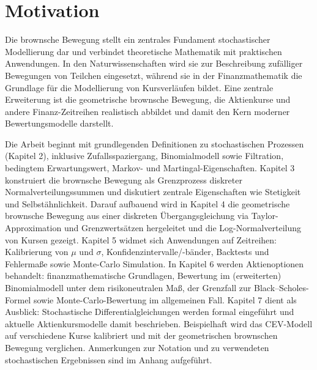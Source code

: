 \section{Motivation}

Die brownsche Bewegung stellt ein zentrales Fundament stochastischer Modellierung dar und verbindet theoretische Mathematik mit praktischen Anwendungen.
In den Naturwissenschaften wird sie zur Beschreibung zufälliger Bewegungen von Teilchen eingesetzt, während sie in der Finanzmathematik die Grundlage für die Modellierung von Kursverläufen bildet.
Eine zentrale Erweiterung ist die geometrische brownsche Bewegung, die Aktienkurse und andere Finanz-Zeitreihen realistisch abbildet und damit den Kern moderner Bewertungsmodelle darstellt.


Die Arbeit beginnt mit grundlegenden Definitionen zu stochastischen Prozessen (Kapitel 2), inklusive Zufallsspaziergang, Binomialmodell sowie Filtration, 
bedingtem Erwartungswert, Markov- und Martingal-Eigenschaften. Kapitel 3 konstruiert die brownsche Bewegung 
als Grenzprozess diskreter Normalverteilungssummen und diskutiert zentrale Eigenschaften wie Stetigkeit und 
Selbstähnlichkeit. Darauf aufbauend wird in Kapitel 4 die geometrische brownsche Bewegung aus einer diskreten Übergangsgleichung via Taylor-Approximation und Grenzwertsätzen hergeleitet und die Log-Normalverteilung von Kursen gezeigt. 
Kapitel 5 widmet sich Anwendungen auf Zeitreihen: Kalibrierung von $\mu$ und $\sigma$, 
Konfidenzintervalle/-bänder, Backtests und Fehlermaße sowie Monte-Carlo Simulation. In 
Kapitel 6 werden Aktienoptionen behandelt: finanzmathematische Grundlagen, Bewertung im 
(erweiterten) Binomialmodell unter dem risikoneutralen Maß, der Grenzfall zur Black–Scholes-Formel sowie 
Monte-Carlo-Bewertung im allgemeinen Fall. Kapitel 7 dient als Ausblick: Stochastische Differentialgleichungen werden formal eingeführt und
aktuelle Aktienkursmodelle damit beschrieben. Beispielhaft wird das CEV-Modell auf verschiedene Kurse kalibriert und mit der geometrischen
brownschen Bewegung verglichen. Anmerkungen zur Notation und zu verwendeten stochastischen Ergebnissen sind im Anhang aufgeführt. 
